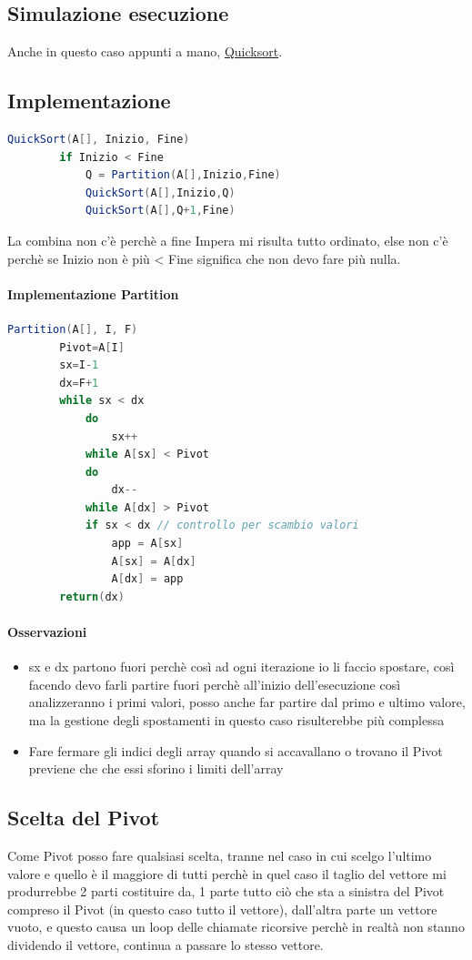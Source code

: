 \subsection{Simulazione esecuzione}
Anche in questo caso appunti a mano, 
\href{https://drive.google.com/file/d/1en_l67ZHW-SypCBgg8bRPyY_YHawljrf/view?usp=sharing}{Quicksort}.
\newpage
\subsection{Implementazione}
\begin{lstlisting}[language=Java]
    QuickSort(A[], Inizio, Fine)
        if Inizio < Fine
            Q = Partition(A[],Inizio,Fine)
            QuickSort(A[],Inizio,Q)
            QuickSort(A[],Q+1,Fine)
\end{lstlisting}
La combina non c'è perchè a fine Impera mi risulta tutto ordinato, else non c'è perchè
se Inizio non è più < Fine significa che non devo fare più nulla.
\paragraph*{Implementazione Partition}
\begin{lstlisting}[language=Java]
    Partition(A[], I, F)
        Pivot=A[I]
        sx=I-1
        dx=F+1
        while sx < dx
            do
                sx++
            while A[sx] < Pivot
            do
                dx--
            while A[dx] > Pivot
            if sx < dx // controllo per scambio valori
                app = A[sx]
                A[sx] = A[dx]
                A[dx] = app
        return(dx)
\end{lstlisting}
\paragraph*{Osservazioni}
\begin{itemize}
    \item sx e dx partono fuori perchè così ad ogni iterazione io li faccio spostare, così facendo
    devo farli partire fuori perchè all'inizio dell'esecuzione così analizzeranno i primi valori, posso anche
    far partire dal primo e ultimo valore, ma la gestione degli spostamenti in questo caso
    risulterebbe più complessa
    \item Fare fermare gli indici degli array quando si accavallano o trovano il Pivot previene che
    che essi sforino i limiti dell'array
\end{itemize}
\subsection{Scelta del Pivot}
Come Pivot posso fare qualsiasi scelta, tranne nel caso in cui scelgo l'ultimo
valore e quello è il maggiore di tutti perchè in quel caso il taglio del vettore mi
produrrebbe 2 parti costituire da, 1 parte tutto ciò che sta a sinistra del Pivot compreso
il Pivot (in questo caso tutto il vettore), dall'altra parte un vettore vuoto, e questo causa
un loop delle chiamate ricorsive perchè in realtà non stanno dividendo il vettore, continua a passare lo stesso
vettore.\\

